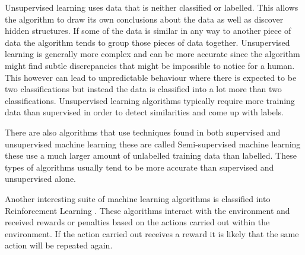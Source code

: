 Unsupervised learning \cite{unsupervised} uses data that is neither classified or labelled. This allows the algorithm to draw its own conclusions about the data as well as discover hidden structures. If some of the data is similar in any way to another piece of data the algorithm tends to group those pieces of data together. Unsupervised learning is generally more complex and can be more accurate since the algorithm might find subtle discrepancies that might be impossible to notice for a human. This however can lead to unpredictable behaviour where there is expected to be two classifications but instead the data is classified into a lot more than two classifications. Unsupervised learning algorithms typically require more training data than supervised in order to detect similarities and come up with labels.

There are also algorithms that use techniques found in both supervised and unsupervised machine learning these are called Semi-supervised \cite{machineLearning0} machine learning these use a much larger amount of unlabelled training data than labelled. These types of algorithms usually tend to be more accurate than supervised and unsupervised alone.

Another interesting suite of machine learning algorithms is classified into Reinforcement Learning \cite{reinforcementLearning}. These algorithms interact with the environment and received rewards or penalties based on the actions carried out within the environment. If the action carried out receives a reward it is likely that the same action will be repeated again. 

%
%
%
%

